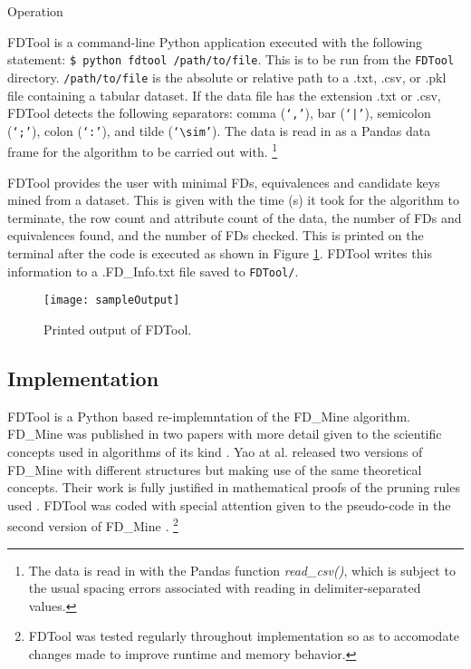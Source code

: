 \documentclass[6pt,twoside]{article}
\theoremstyle{plain}
\theoremstyle{definition}
\begin{document}
\begin{section}{Operation}

FDTool is a command-line Python application executed with the following statement:  \texttt{\$ python fdtool /path/to/file}. This is to be run from the \texttt{FDTool} directory. \texttt{/path/to/file} is the absolute or relative path to a .txt, .csv, or .pkl file containing a tabular dataset. If the data file has the extension .txt or .csv, FDTool detects the following separators: comma (\texttt{`,'}), bar (\texttt{`|'}), semicolon (\texttt{`;'}), colon (\texttt{`:'}), and tilde (\texttt{`$\sim$'}). The data is read in as a Pandas data frame for the algorithm to be carried out with. \footnote{The data is read in with the Pandas function \textit{read\_csv()}, which is subject to the usual spacing errors associated with reading in delimiter-separated values.}

FDTool provides the user with minimal FDs, equivalences and candidate keys mined from a dataset. This is given with the time (s) it took for the algorithm to terminate, the row count and attribute count of the data, the number of FDs  and equivalences found, and the number of FDs checked. This is printed on the terminal after the code is executed as shown in Figure \ref{fig:output}. FDTool writes this information to a .FD\_Info.txt file saved to \texttt{FDTool/}. 

\begin{figure}[h]
	\centering
	\texttt{[image: sampleOutput]}
	\textbf{\label{Fig. 3}}
	\caption{Printed output of FDTool.}
	\label{fig:output}
\end{figure}

\subsection[Implementation]{Implementation}

FDTool is a Python based re-implemntation of the FD\_Mine algorithm. FD\_Mine was published in two papers with more detail given to the scientific concepts used in algorithms of its kind  \cite{fdmine1} \cite{fdmine2}. Yao at al. released two versions of FD\_Mine with different structures but making use of the same theoretical concepts. Their work is fully justified in mathematical proofs of the pruning rules used \cite{fdmine2}. FDTool was coded with special attention given to the pseudo-code in the second version of FD\_Mine \cite{fdmine2}. \footnote{FDTool was tested regularly throughout implementation so as to accomodate changes made to improve runtime and memory behavior.}


\end{section}
\end{document}
